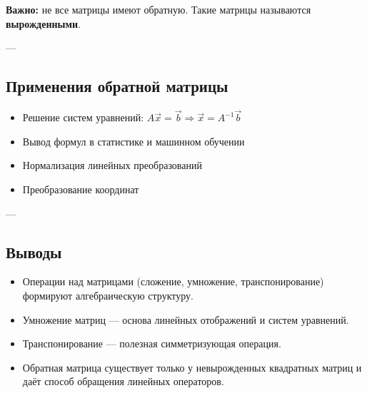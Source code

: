 \textbf{Важно:} не все матрицы имеют обратную. Такие матрицы называются \textbf{вырожденными}.

---

\subsection*{Применения обратной матрицы}

\begin{itemize}
  \item Решение систем уравнений: $A\vec{x} = \vec{b} \Rightarrow \vec{x} = A^{-1}\vec{b}$
  \item Вывод формул в статистике и машинном обучении
  \item Нормализация линейных преобразований
  \item Преобразование координат
\end{itemize}

---

\subsection*{Выводы}

\begin{itemize}
  \item Операции над матрицами (сложение, умножение, транспонирование) формируют алгебраическую структуру.
  \item Умножение матриц — основа линейных отображений и систем уравнений.
  \item Транспонирование — полезная симметризующая операция.
  \item Обратная матрица существует только у невырожденных квадратных матриц и даёт способ обращения линейных операторов.
\end{itemize}
